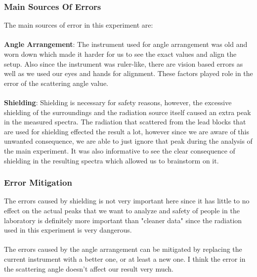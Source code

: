 		\subsubsection{Main Sources Of Errors}
			The main sources of error in this experiment are:
			\\
			\\
				\textbf{Angle Arrangement}: 
					The instrument used for angle arrangement was old and worn down which made it harder for us to see the exact values and align the setup. Also since the instrument was ruler-like, there are vision based errors as well as we used our eyes and hands for alignment. These factors played role in the error of the scattering angle value.
					\\
					\\
				\textbf{Shielding}: 
					Shielding is necessary for safety reasons, however, the excessive shielding of the surroundings and the radiation source itself caused an extra peak in the measured spectra. The radiation that scattered from the lead blocks that are used for shielding effected the result a lot, however since we are aware of this unwanted consequence, we are able to just ignore that peak during the analysis of the main experiment. It was also informative to see the clear consequence of shielding in the resulting spectra which allowed us to brainstorm on it. 
		\subsubsection{Error Mitigation}
			The errors caused by shielding is not very important here since it has little to no effect on the actual peaks that we want to analyze and safety of people in the laboratory is definitely more important than "cleaner data" since the radiation used in this experiment is very dangerous. 
			\\
			\\
			The errors caused by the angle arrangement can be mitigated by replacing the current instrument with a better one, or at least a new one. I think the error in the scattering angle doesn't affect our result very much.